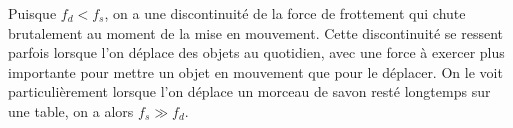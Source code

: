 \documentclass[11pt,fleqn]{book} %
\newcommand{\dd}{\mathrm{d}}
\begin{document}
%

\begin{remark}
    Puisque $f_d < f_s$, on a une discontinuité de la force de frottement qui chute brutalement au moment de la mise en mouvement. Cette discontinuité se ressent parfois lorsque l'on déplace des objets au quotidien, avec une force à exercer plus importante pour mettre un objet en mouvement que pour le déplacer. On le voit particulièrement lorsque l'on déplace un morceau de savon resté longtemps sur une table, on a alors $f_s \gg f_d$.
\end{remark}
\end{document}

